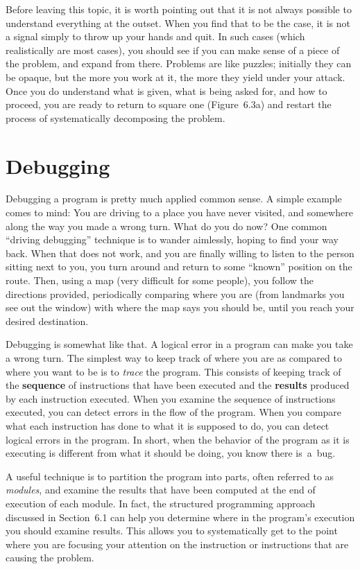 \documentclass{patt}
\begin{document}
\lightbulb[3pc] Before leaving this topic, it is worth pointing
out that it is not always possible to understand everything at the
outset. When you find that to be the case, it is not a signal
simply to throw up your hands and quit. In such cases (which
realistically are most cases), you should see if you can make
sense of a piece of the problem, and expand from there. Problems
are like puzzles; initially they can be opaque, but the more you
work at it, the more they yield under your attack. Once you do
understand what is given, what is being asked for, and how to
proceed, you are ready to return to square one (Figure~6.3a) and
restart the process of systematically decomposing the problem.

\section{Debugging}

Debugging a program is pretty much applied common sense.
A simple 
example comes to mind: You are driving to a place you have never
visited, and somewhere along the way you made a wrong turn. What do
you do now? One common ``driving debugging'' technique is to wander
aimlessly, hoping to find your way back. When that does not work,
and you are finally willing to listen to the person sitting next to you, you
turn around and return to some ``known'' position on the route. Then,
using a map (very difficult for some people), you follow the directions
provided, periodically comparing where you are (from landmarks you see
out the window) with where the map says you should be, until you reach
your desired destination.

Debugging is somewhat like that.  A logical error in a program can make
you take a wrong turn.  The simplest way to keep track of where you are
as compared to where you want to be is to {\em trace} the program.
This consists of keeping track of the {\bf sequence} of instructions
that have been executed and the {\bf results} produced by each
instruction executed.  When you examine the sequence of instructions
executed, you can detect errors in the flow of the program.
When you compare what each instruction has done to what it is supposed
to do, you can detect logical errors in the program.  In short, when
the behavior of the program as it is executing is different from
what it should be doing, you know there is~a~bug.

A useful technique is to partition the program into parts, often
referred to as {\em modules}, and examine the results that have been
computed at the end of execution of each module.  In fact, the structured programming
approach discussed in Section~6.1 can help you determine where in the
program's execution you should examine results.  This allows you to
systematically get to the point where you are focusing your attention on
the instruction or instructions that are causing the problem.
\end{document}
